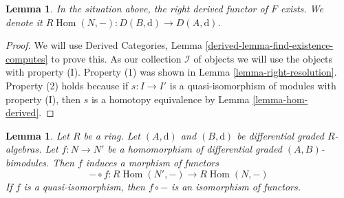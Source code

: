 \documentclass{stacks-project}
\theoremstyle{plain}
\newtheorem{lemma}[subsection]{Lemma}
\theoremstyle{definition}
\theoremstyle{remark}
\numberwithin{equation}{subsection}
\def\Hom{\mathop{\mathrm{Hom}}\nolimits}
\begin{document}
\begin{lemma}
\label{lemma-derived-restriction}
In the situation above, the right derived functor of $F$ exists.
We denote it $R\Hom(N, -) : D(B, \text{d}) \to D(A, \text{d})$.
\end{lemma}

\begin{proof}
We will use
Derived Categories, Lemma \ref{derived-lemma-find-existence-computes}
to prove this. As our collection $\mathcal{I}$
of objects we will use the objects with property (I).
Property (1) was shown in Lemma \ref{lemma-right-resolution}.
Property (2) holds because if $s : I \to I'$ is a quasi-isomorphism
of modules with property (I), then $s$ is a homotopy equivalence
by Lemma \ref{lemma-hom-derived}.
\end{proof}

\begin{lemma}
\label{lemma-functoriality-derived-restriction}
Let $R$ be a ring. Let $(A, \text{d})$ and $(B, \text{d})$ be
differential graded $R$-algebras. Let $f : N \to N'$ be a
homomorphism of differential graded $(A, B)$-bimodules.
Then $f$ induces a morphism of functors
$$
- \circ f : R\Hom(N', -) \longrightarrow R\Hom(N, -)
$$
If $f$ is a quasi-isomorphism, then $f \circ -$ is an isomorphism of
functors.
\end{lemma}
\end{document}
